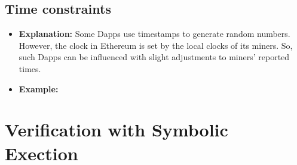 \documentclass{llncs}
\begin{document}
\subsection{Time constraints}
\begin{itemize}
\item \textbf{Explanation:} 
Some Dapps use timestamps to generate random numbers. However, the clock in Ethereum is set by the local clocks of its miners. So, such Dapps can be influenced with slight adjustments to miners’ reported times.

\item \textbf{Example:}

\end{itemize}



\section{Verification with Symbolic Exection}
\end{document}

